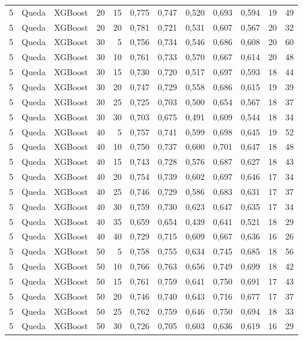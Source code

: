 \begin{longtable}{@{}rllrrrrrrrrr@{}}
5 & Queda & XGBoost & 20 & 15 & 0,775 & 0,747 & 0,520 & 0,693 & 0,594 & 19 & 49 \\
5 & Queda & XGBoost & 20 & 20 & 0,781 & 0,721 & 0,531 & 0,607 & 0,567 & 20 & 32 \\
5 & Queda & XGBoost & 30 & 5 & 0,756 & 0,734 & 0,546 & 0,686 & 0,608 & 20 & 60 \\
5 & Queda & XGBoost & 30 & 10 & 0,761 & 0,733 & 0,570 & 0,667 & 0,614 & 20 & 48 \\
5 & Queda & XGBoost & 30 & 15 & 0,730 & 0,720 & 0,517 & 0,697 & 0,593 & 18 & 44 \\
5 & Queda & XGBoost & 30 & 20 & 0,747 & 0,729 & 0,558 & 0,686 & 0,615 & 19 & 39 \\
5 & Queda & XGBoost & 30 & 25 & 0,725 & 0,703 & 0,500 & 0,654 & 0,567 & 18 & 37 \\
5 & Queda & XGBoost & 30 & 30 & 0,703 & 0,675 & 0,491 & 0,609 & 0,544 & 18 & 34 \\
5 & Queda & XGBoost & 40 & 5 & 0,757 & 0,741 & 0,599 & 0,698 & 0,645 & 19 & 52 \\
5 & Queda & XGBoost & 40 & 10 & 0,750 & 0,737 & 0,600 & 0,701 & 0,647 & 18 & 48 \\
5 & Queda & XGBoost & 40 & 15 & 0,743 & 0,728 & 0,576 & 0,687 & 0,627 & 18 & 43 \\
5 & Queda & XGBoost & 40 & 20 & 0,754 & 0,739 & 0,602 & 0,697 & 0,646 & 17 & 34 \\
5 & Queda & XGBoost & 40 & 25 & 0,746 & 0,729 & 0,586 & 0,683 & 0,631 & 17 & 37 \\
5 & Queda & XGBoost & 40 & 30 & 0,759 & 0,730 & 0,623 & 0,647 & 0,635 & 17 & 34 \\
5 & Queda & XGBoost & 40 & 35 & 0,659 & 0,654 & 0,439 & 0,641 & 0,521 & 18 & 29 \\
5 & Queda & XGBoost & 40 & 40 & 0,729 & 0,715 & 0,609 & 0,667 & 0,636 & 16 & 26 \\
5 & Queda & XGBoost & 50 & 5 & 0,758 & 0,755 & 0,634 & 0,745 & 0,685 & 18 & 56 \\
5 & Queda & XGBoost & 50 & 10 & 0,766 & 0,763 & 0,656 & 0,749 & 0,699 & 18 & 42 \\
5 & Queda & XGBoost & 50 & 15 & 0,761 & 0,759 & 0,641 & 0,750 & 0,691 & 17 & 43 \\
5 & Queda & XGBoost & 50 & 20 & 0,746 & 0,740 & 0,643 & 0,716 & 0,677 & 17 & 37 \\
5 & Queda & XGBoost & 50 & 25 & 0,762 & 0,759 & 0,646 & 0,750 & 0,694 & 18 & 33 \\
5 & Queda & XGBoost & 50 & 30 & 0,726 & 0,705 & 0,603 & 0,636 & 0,619 & 16 & 29 \\

\end{longtable}
